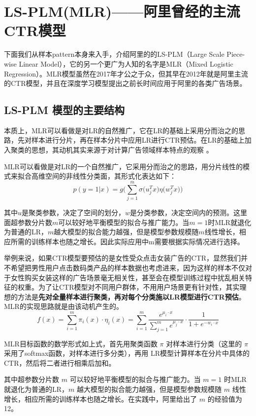\documentclass[12pt]{article}
\begin{document}
\section{LS-PLM(MLR)——阿里曾经的主流CTR模型}
下面我们从样本pattern本身来入手，介绍阿里的的LS-PLM（Large Scale Piece-wise Linear Model），它的另一个更广为人知的名字是MLR（Mixed Logistic Regression）。MLR模型虽然在2017年才公之于众，但其早在2012年就是阿里主流的CTR模型，并且在深度学习模型提出之前长时间应用于阿里的各类广告场景。

\subsection{LS-PLM 模型的主要结构}
本质上，MLR可以看做是对LR的自然推广，它在LR的基础上采用分而治之的思路，先对样本进行分片，再在样本分片中应用LR进行CTR预估。在LR的基础上加入聚类的思想，其动机其实来源于对计算广告领域样本特点的观察 。

MLR可以看做是对LR的一个自然推广，它采用分而治之的思路，用分片线性的模式来拟合高维空间的非线性分类面，其形式化表达如下\cite{Recommender_System_With_Deep_Learning_MLR}：
$$
p(y=1|x) = g\Bigg( \sum_{j=1}^m\sigma\Big(u^T_jx\Big)\eta\Big(w^T_jx\Big)\Bigg)
$$

其中$u$是聚类参数，决定了空间的划分，$w$是分类参数，决定空间内的预测。这里面超参数分片数$m$可以较好地平衡模型的拟合与推广能力。当$m=1$时MLR就退化为普通的LR，$m$越大模型的拟合能力越强，但是模型参数规模随$m$线性增长，相应所需的训练样本也随之增长。因此实际应用中m需要根据实际情况进行选择。


举例来说，如果CTR模型要预估的是女性受众点击女装广告的CTR，显然我们并不希望把男性用户点击数码类产品的样本数据也考虑进来，因为这样的样本不仅对于女性购买女装这样的广告场景毫无相关性，甚至会在模型训练过程中扰乱相关特征的权重。为了让CTR模型对不同用户群体，不用用户场景更有针对性，其实理想的方法是\textbf{先对全量样本进行聚类，再对每个分类施以LR模型进行CTR预估}。MLR的实现思路就是由该动机产生的。
$$
f(x) = \sum_{i=1}^m\pi_i(x) \cdot \eta_i(x) = \sum_{i=1}^m \frac{e^{\mu_i \cdot x}}{\sum_{j=1}^m e^{\mu_j\cdot x}} \cdot \frac{1}{1+e^{-w_i\cdot x}}
$$

MLR目标函数的数学形式如上式，首先用聚类函数 $\pi$ 对样本进行分类（这里的 $\pi$ 采用了softmax函数，对样本进行多分类），再用 LR模型计算样本在分片中具体的 CTR，然后将二者进行相乘后加和。

其中超参数分片数 $m$ 可以较好地平衡模型的拟合与推广能力。当 $m=1$ 时MLR就退化为普通的LR，$m$ 越大模型的拟合能力越强，但是模型参数规模随 $m$ 线性增长，相应所需的训练样本也随之增长。在实践中，阿里给出了 $m$ 的经验值为12。
\end{document}
